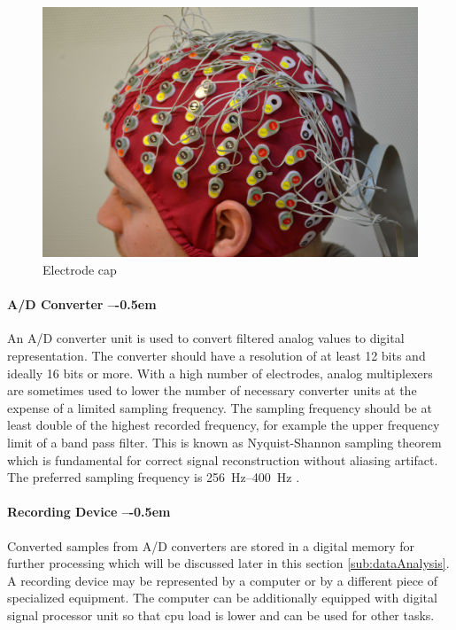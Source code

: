 \begin{figure}[t]
	\centering
	\includegraphics[width=1\linewidth]{fig/eegCap.jpg}
	\caption[Caption for LOF]{Electrode cap\protect\footnotemark}
	\label{fig:eegCap}
\end{figure}

\paragraph{A/D Converter --\kern-0.5em}
An A/D converter unit is used to convert filtered analog values to digital
representation. The converter should have a resolution of at least 12 bits and
ideally 16 bits or more. With a high number of electrodes, analog multiplexers are
sometimes used to lower the number of necessary converter units at the expense
of a limited sampling frequency. The sampling frequency should be at least double of
the highest recorded frequency, for example the upper frequency limit of a
band pass filter. This is known as Nyquist-Shannon sampling theorem which is
fundamental for correct signal reconstruction without aliasing artifact. The
preferred sampling frequency is \SIrange{256}{400}{\Hz} \cite{guidDigEEG}.

\paragraph{Recording Device --\kern-0.5em}
Converted samples from A/D converters are stored in a digital memory for further
processing which will be discussed later in this section \ref{sub:dataAnalysis}.
A recording device may be represented by a computer or by a
different piece of specialized equipment. The computer can be additionally
equipped with digital signal processor unit so that \gls{cpu} load is lower and can be
used for other tasks.

